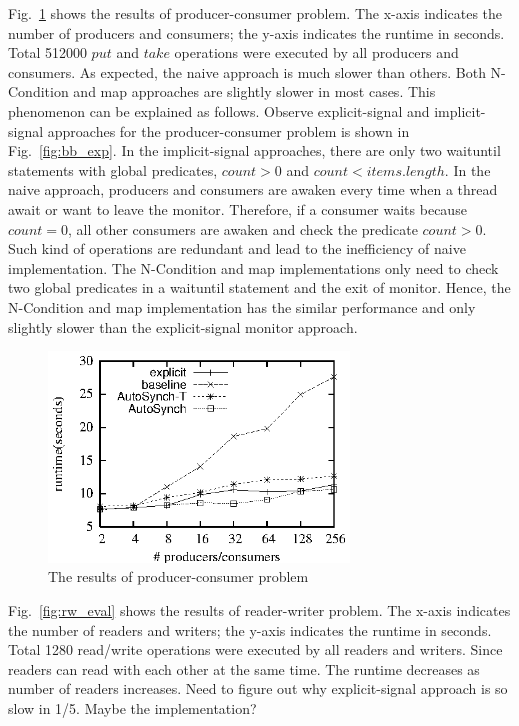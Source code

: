 \documentclass[preprint]{sigplanconf}
\begin{document}
Fig.~\ref{fig:pc_eval} shows the results of producer-consumer problem. The
x-axis indicates the number of producers and consumers; the y-axis indicates the
runtime in seconds. Total 512000 $put$ and $take$ operations were executed by
all producers and consumers. As expected, the naive approach is much slower than
others. Both N-Condition and map approaches are slightly slower in most cases.
This phenomenon can be explained as follows. Observe explicit-signal and 
implicit-signal approaches for the producer-consumer problem is shown in 
Fig.~\ref{fig:bb_exp}. In the implicit-signal approaches, there are only two 
waituntil statements with global predicates, $count > 0$ and 
$count < items.length$. In the naive approach, producers and consumers are
awaken every time when a thread await or want to leave the monitor. Therefore,
if a consumer waits because $count = 0$, all other consumers are awaken and
check the predicate $count > 0$. Such kind of operations are redundant and lead
to the inefficiency of naive implementation. The N-Condition and map
implementations only need to check two global predicates in a waituntil
statement and the exit of monitor. Hence, the N-Condition and map implementation 
has the similar performance and only slightly slower than the explicit-signal
monitor approach. 
\begin{figure}[ht!]
  \centering
  \includegraphics[width=80mm]{fig/pc.eps}
  \caption{The results of producer-consumer problem}
  \label{fig:pc_eval}
\end{figure}

Fig.~\ref{fig:rw_eval} shows the results of reader-writer problem. The
x-axis indicates the number of readers and writers; the y-axis indicates the
runtime in seconds. Total 1280 read/write operations were executed by all
readers and writers. Since readers can read with each other at the same time.
The runtime decreases as number of readers increases. Need to figure out why 
explicit-signal approach is so slow in 1/5. Maybe the implementation? 
\end{document}

